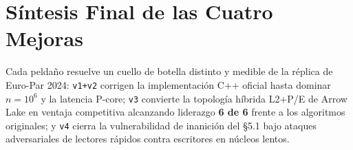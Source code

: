\documentclass[11pt,a4paper]{article}
\begin{document}
\section{Síntesis Final de las Cuatro Mejoras}

\begin{table}[H]
\centering
\caption{Comparativa integrada de la evolución \texttt{Autores} $\to$ \texttt{v1} $\to$ \texttt{v2} $\to$ \texttt{v3} $\to$ \texttt{v4} en Intel Core Ultra 9 285.}
\label{tab:sintesis_final}
\end{table}

Cada peldaño resuelve un cuello de botella distinto y medible de la réplica de Euro-Par 2024: \texttt{v1+v2} corrigen la implementación C++ oficial hasta dominar $n=10^6$ y la latencia P-core; \texttt{v3} convierte la topología híbrida L2+P/E de Arrow Lake en ventaja competitiva alcanzando liderazgo \textbf{6 de 6} frente a los algoritmos originales; y \texttt{v4} cierra la vulnerabilidad de inanición del \S 5.1 bajo ataques adversariales de lectores rápidos contra escritores en núcleos lentos.



\end{document}
